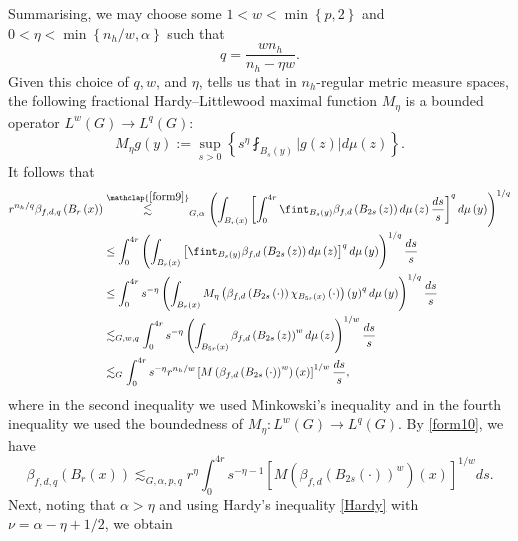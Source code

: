 \documentclass[11pt,reqno]{amsart}
\newcommand{\1}{\mathbf 1}
\begin{document}
\begin{itemize}
Summarising, we may choose some $1 < w < \min\left\{p,2\right\}$ and $0 < \eta < \min\left\{n_h/w,\alpha\right\}$ such that
\begin{equation}\label{form10}
q = \frac{w{n_h}}{{n_h} - \eta w}.
\end{equation}
Given this choice of $q,w$, and $\eta$, \cite[Theorem 4.1]{heikkinen2013fractional} tells us that in ${n_h}$-regular metric measure spaces, the following fractional Hardy--Littlewood maximal function $M_\eta$ is a bounded operator $L^{w}\left(G\right) \to L^{q}\left(G\right)$:
\[
M_{\eta}g\left(y\right) := \sup_{s > 0} \left\{ s^{\eta} \fint_{B_s\left(y\right)} \left|g\left(z\right)\right|  d\mu\left(z\right) \right\}.
\]
It follows that
\begin{align*}
r^{n_h/q}\beta_{f,d,q}\left(B_r\left(x\right)\right) &\stackrel{\mathclap{\eqref{form9}}}{\lesssim}_{G,\alpha} \left(\int_{B_r\left(x\right)}\left[\int_0^{4r} \fint_{B_s\left(y\right)} \beta_{f,d}\left(B_{2s}\left(z\right)\right)  d\mu\left(z\right)  \frac{ds}{s}\right]^q d\mu\left(y\right)\right)^{1/q}\\
&\le \int_0^{4r}\left(\int_{B_r\left(x\right)}\left[ \fint_{B_s\left(y\right)} \beta_{f,d}\left(B_{2s}\left(z\right)\right)  d\mu\left(z\right)  \right]^q d\mu\left(y\right)\right)^{1/q}\frac{ds}{s}\\
& \le \int_0^{4r} s^{-\eta} \left( \int_{B_r\left(x\right)} M_\eta\left(\beta_{f,d}\left(B_{2s}\left(\cdot\right)\right)\chi_{B_{5r}\left(x\right)}\left(\cdot\right)\right)\left(y\right)^q  d\mu\left(y\right) \right)^{1/q}  \frac{ds}{s}\\
& \lesssim_{G,w,q} \int_0^{4r} s^{-\eta} \left( \int_{B_{5r}\left(x\right)} \beta_{f,d}\left(B_{2s}\left(z\right)\right)^w  d\mu\left(z\right) \right)^{1/w}  \frac{ds}{s}\\
& \lesssim_G \int_0^{4r} s^{-\eta} r^{n_h/w} \left[M\left(\beta_{f,d}\left(B_{2s}\left(\cdot\right)\right)^w\right)\left(x\right)\right]^{1/w}  \frac{ds}{s},
\end{align*}
where in the second inequality we used Minkowski's inequality and in the fourth inequality we used the boundedness of $M_\eta:L^w\left(G\right) \to L^q\left(G\right)$. By \eqref{form10}, we have
\[
\beta_{f,d,q}\left(B_r\left(x\right)\right) \lesssim_{G,\alpha,p,q} r^\eta \int_0^{4r} s^{-\eta - 1} \left[M\left(\beta_{f,d}\left(B_{2s}\left(\cdot\right)\right)^w\right)\left(x\right)\right]^{1/w}  ds.
\]
Next, noting that $\alpha>\eta$ and using Hardy's inequality \eqref{Hardy} with $\nu=\alpha-\eta+1/2$, we obtain
\begin{align*}

\end{align*}
\end{itemize}
\end{document}
